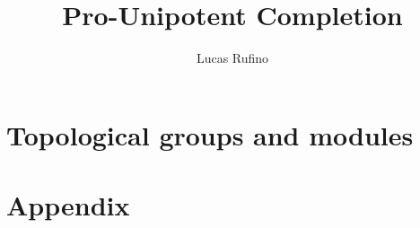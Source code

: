 \documentclass{article}
\title{Pro-Unipotent Completion}
\author{Lucas Rufino}
\date{}
\begin{document}
\maketitle

\tableofcontents



\section{Topological groups and modules}


\section{Appendix}



\printbibliography
\end{document}
